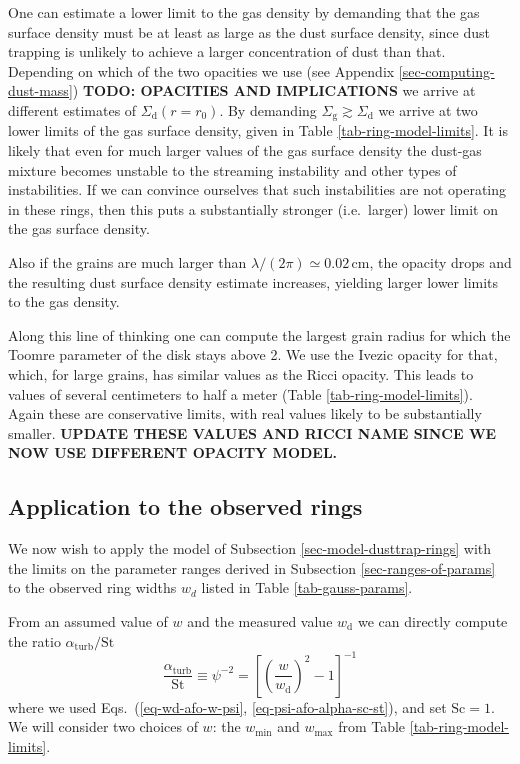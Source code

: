 \documentclass{aa}
\begin{document}
One can estimate a lower limit to the gas density by demanding that the gas
surface density must be at least as large as the dust surface density, since
dust trapping is unlikely to achieve a larger concentration of dust than
that. Depending on which of the two opacities we use (see Appendix
\ref{sec-computing-dust-mass}) {\bf TODO: OPACITIES AND IMPLICATIONS} we arrive at different estimates of
$\Sigma_{\mathrm{d}}(r=r_0)$. By demanding $\Sigma_{\mathrm{g}}\gtrsim
\Sigma_{\mathrm{d}}$ we arrive at two lower limits of the gas surface density, given in
Table \ref{tab-ring-model-limits}. It is likely that even for much
larger values of the gas surface density the dust-gas mixture becomes
unstable to the streaming instability and other types of instabilities.
If we can convince ourselves that such instabilities are not operating
in these rings, then this puts a substantially stronger (i.e.~larger)
lower limit on the gas surface density.

Also if the grains are much larger than $\lambda/(2\pi)\simeq 0.02\,\mathrm{cm}$,
the opacity drops and the resulting dust surface density estimate increases,
yielding larger lower limits to the gas density.

Along this line of thinking one can compute the largest grain radius for which
the Toomre parameter of the disk stays above 2. We use the Ivezic
opacity for that, which, for large grains, has similar values as the Ricci
opacity. This leads to values of several centimeters to half a meter (Table
\ref{tab-ring-model-limits}). Again these are conservative limits, with real
values likely to be substantially smaller. {\bf UPDATE THESE VALUES AND RICCI
NAME SINCE WE NOW USE DIFFERENT OPACITY MODEL.}


\subsection{Application to the observed rings}
\label{sec-application-to-rings}
%
We now wish to apply the model of Subsection \ref{sec-model-dusttrap-rings}
with the limits on the parameter ranges derived in Subsection
\ref{sec-ranges-of-params} to the observed ring widths $w_d$ listed in
Table \ref{tab-gauss-params}. 

From an assumed value of $w$ and the measured value $w_{\mathrm{d}}$ we can
directly compute the ratio $\alpha_{\mathrm{turb}}/\mathrm{St}$
\begin{equation}\label{eq-alphaSt-equation}
\frac{\alpha_{\mathrm{turb}}}{\mathrm{St}} \equiv \psi^{-2} = \left[\left(\frac{w}{w_{\mathrm{d}}}\right)^2-1\right]^{-1}
\end{equation}
where we used Eqs.~(\ref{eq-wd-afo-w-psi}, \ref{eq-psi-afo-alpha-sc-st}), and
set $\mathrm{Sc}=1$. We will consider two choices of $w$: the $w_{\mathrm{min}}$ and
$w_{\mathrm{max}}$ from Table \ref{tab-ring-model-limits}. 
\end{document}
